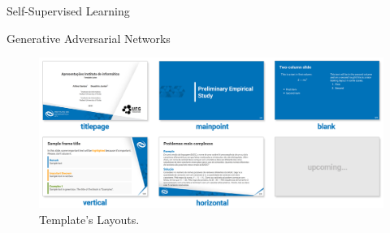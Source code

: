 \begin{frame}{Self-Supervised Learning}
\end{frame}

\begin{frame}{Generative Adversarial Networks}
    \begin{figure}
        \centering
        \includegraphics[width=.9\textwidth]{readme/layouts.png}
        \caption{Template's Layouts.}
        \label{fig:gans}
    \end{figure}
\end{frame}
